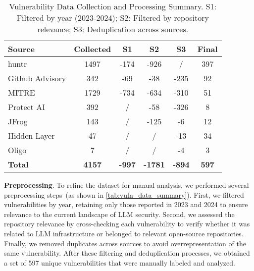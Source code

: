 \begin{table}[ht]
\centering
\caption{Vulnerability Data Collection and Processing Summary. S1: Filtered by year (2023-2024); S2: Filtered by repository relevance; S3: Deduplication across sources.}
\fontsize{9}{13}\selectfont
\begin{tabular}{lccccc}
\hline
\textbf{Source}              & \textbf{Collected} & \textbf{S1} & \textbf{S2} & \textbf{S3} & \textbf{Final} \\ \hline
huntr                        & 1497        & -174         & -926         & /           & 397         \\ \hline
Github Advisory     & 342         & -69          & -38          & -235         & 92          \\
MITRE           & 1729        & -734         & -634         & -310         & 51          \\ \hline
Protect AI                   & 392         & /            & -58          & -326         & 8          \\
JFrog                        & 143         & /            & -125         & -6           & 12          \\
Hidden Layer                 & 47          & /            & /            & -13          & 34          \\
Oligo                        & 7           & /            & /            & -4           & 3           \\ \hline
\textbf{Total}                     & \textbf{4157}        & \textbf{-997}         & \textbf{-1781}        & \textbf{-894}         & \textbf{597}         \\ \hline
\end{tabular}
\label{tab:vuln_data_summary}
\end{table}

\noindent \textbf{Preprocessing}. To refine the dataset for manual analysis, we performed several preprocessing steps~(as shown in \autoref{tab:vuln_data_summary}). First, we filtered vulnerabilities by year, retaining only those reported in 2023 and 2024 to ensure relevance to the current landscape of LLM security. Second, we assessed the repository relevance by cross-checking each vulnerability to verify whether it was related to LLM infrastructure or belonged to relevant open-source repositories. Finally, we removed duplicates across sources to avoid overrepresentation of the same vulnerability. After these filtering and deduplication processes, we obtained a set of 597 unique vulnerabilities that were manually labeled and analyzed.

